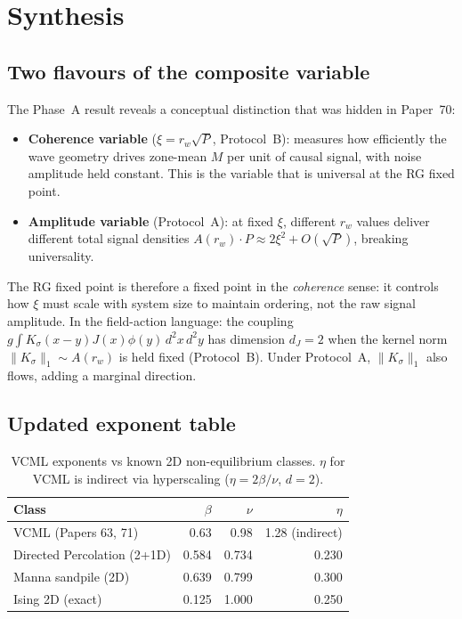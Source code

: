 \documentclass[twocolumn,10pt]{article}
\begin{document}
\section{Synthesis}

\subsection{Two flavours of the composite variable}

The Phase~A result reveals a conceptual distinction that was hidden in
Paper~70:
\begin{itemize}
  \item \textbf{Coherence variable} ($\xi=r_w\sqrt{P}$, Protocol~B):
        measures how efficiently the wave geometry drives zone-mean $M$
        per unit of causal signal, with noise amplitude held constant.
        This is the variable that is universal at the RG fixed point.
  \item \textbf{Amplitude variable} (Protocol~A):
        at fixed $\xi$, different $r_w$ values deliver different total
        signal densities $A(r_w)\cdot P\approx 2\xi^2+O(\sqrt{P})$,
        breaking universality.
\end{itemize}
The RG fixed point is therefore a fixed point in the \emph{coherence} sense:
it controls how $\xi$ must scale with system size to maintain ordering,
not the raw signal amplitude.
In the field-action language: the coupling
$g\int K_\sigma(x-y)J(x)\phi(y)\,d^2x\,d^2y$ has dimension $d_J=2$ when
the kernel norm $\|K_\sigma\|_1\sim A(r_w)$ is held fixed (Protocol~B).
Under Protocol~A, $\|K_\sigma\|_1$ also flows, adding a marginal direction.

\subsection{Updated exponent table}

\begin{table}[h]
\centering
\caption{VCML exponents vs known 2D non-equilibrium classes.
$\eta$ for VCML is indirect via hyperscaling ($\eta=2\beta/\nu$, $d=2$).}
\label{tab:compare}
\begin{tabular}{lrrr}
\toprule
Class & $\beta$ & $\nu$ & $\eta$ \\
\midrule
VCML (Papers 63, 71) & 0.63 & 0.98 & 1.28 (indirect) \\
Directed Percolation (2+1D) & 0.584 & 0.734 & 0.230 \\
Manna sandpile (2D) & 0.639 & 0.799 & 0.300 \\
Ising 2D (exact) & 0.125 & 1.000 & 0.250 \\
\bottomrule
\end{tabular}
\end{table}
\end{document}
